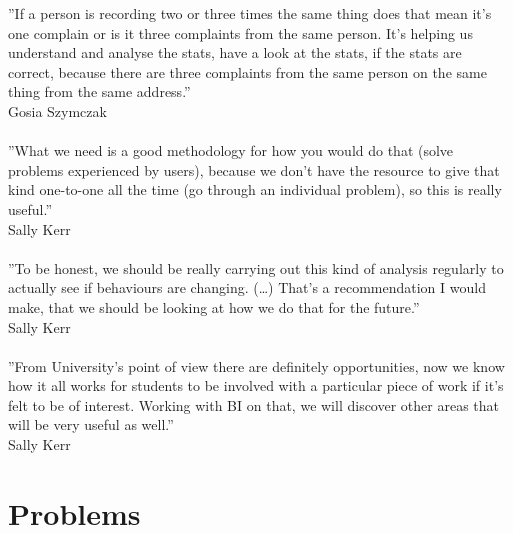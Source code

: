 ''If a person is recording two or three times the same thing does that mean it’s one complain or is it three complaints from the same person. It’s helping us understand and analyse the stats, have a look at the stats, if the stats are correct, because there are three complaints from the same person on the same thing from the same address.''\\
Gosia Szymczak\\\\
''What we need is a good methodology for how you would do that (solve problems experienced by users), because we don’t have the resource to give that kind one-to-one all the time (go through an individual problem), so this is really useful.''\\
Sally Kerr\\\\
''To be honest, we should be really carrying out this kind of analysis regularly to actually see if behaviours are changing. (…) That’s a recommendation I would make, that we should be looking at how we do that for the future.''\\
Sally Kerr\\\\
''From University’s point of view there are definitely opportunities, now we know how it all works for students to be involved with a particular piece of work if it’s felt to be of interest. Working with BI on that, we will discover other areas that will be very useful as well.''\\
Sally Kerr\\

	\section{Problems}
	
